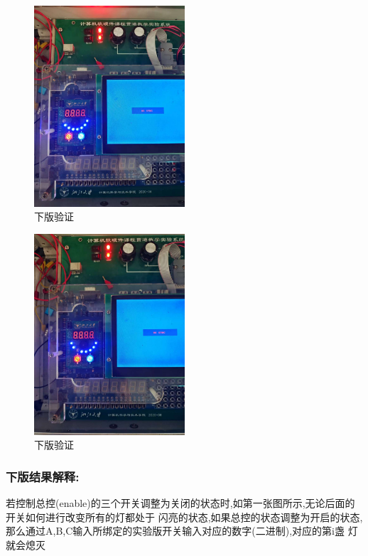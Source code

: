 \documentclass{article}
\begin{document}
	\begin{figure}[H]
	\centering
	\includegraphics[width=0.5\textwidth]{12.jpg}
	\caption{\label{Lab5}下版验证}

	\end{figure}
	\begin{figure}[H]
	\centering
	\includegraphics[width=0.5\textwidth]{13.jpg}
	\caption{\label{Lab5}下版验证}
	\end{figure}

\subsubsection*{下版结果解释:}

若控制总控(enable)的三个开关调整为关闭的状态时,如第一张图所示,无论后面的开关如何进行改变所有的灯都处于
闪亮的状态,如果总控的状态调整为开启的状态,那么通过A,B,C输入所绑定的实验版开关输入对应的数字(二进制),对应的第i盏
灯就会熄灭
\end{document}

